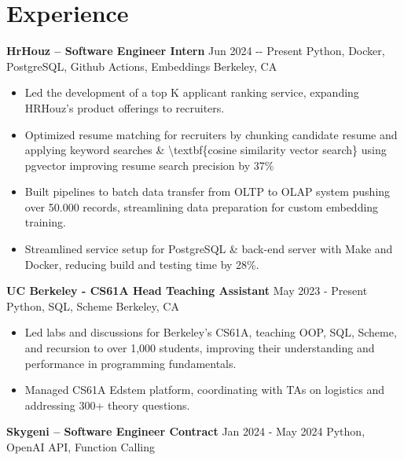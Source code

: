 \documentclass{article}%
\begin{document}
\section{Experience}%
\label{sec:Experience}%
\textbf{HrHouz – Software Engineer Intern}%
\hspace*{1em}%
Jun 2024 {-}{-} Present%
\newline%
Python, Docker, PostgreSQL, Github Actions, Embeddings%
\hspace*{1em}%
Berkeley, CA%
\newline%
\begin{itemize}%
\item%
Led the development of a top K applicant ranking service, expanding HRHouz's product offerings to recruiters.%
\item%
Optimized resume matching for recruiters by chunking candidate resume and applying keyword searches \& \textbackslash{}textbf\{cosine similarity vector search\} using pgvector improving resume search precision by 37\%%
\item%
Built pipelines to batch data transfer from OLTP to OLAP system pushing over 50.000 records, streamlining data preparation for custom embedding training.%
\item%
Streamlined service setup for PostgreSQL \& back{-}end server with Make and Docker, reducing build and testing time by 28\%.%
\end{itemize}%
\newline%
\textbf{UC Berkeley {-} CS61A Head Teaching Assistant}%
\hspace*{1em}%
May 2023 {-} Present%
\newline%
Python, SQL, Scheme%
\hspace*{1em}%
Berkeley, CA%
\newline%
\begin{itemize}%
\item%
Led labs and discussions for Berkeley's CS61A, teaching OOP, SQL, Scheme, and recursion to over 1,000 students, improving their understanding and performance in programming fundamentals.%
\item%
Managed CS61A Edstem platform, coordinating with TAs on logistics and addressing 300+ theory questions.%
\end{itemize}%
\newline%
\textbf{Skygeni – Software Engineer Contract}%
\hspace*{1em}%
Jan 2024 {-}  May 2024%
\newline%
Python, OpenAI API, Function Calling%
\end{document}
